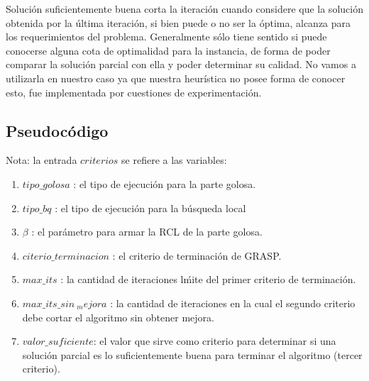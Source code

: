 Soluci\'on suficientemente buena corta la iteraci\'on cuando considere que la soluci\'on obtenida por la \'ultima iteraci\'on, si bien puede o no ser la \'optima, alcanza para los requerimientos del problema. Generalmente s\'olo tiene sentido si puede conocerse alguna cota de optimalidad para la instancia, de forma de poder comparar la soluci\'on parcial con ella y poder determinar su calidad. No vamos a utilizarla en nuestro caso ya que nuestra heur\'istica no posee forma de conocer esto, fue implementada por cuestiones de experimentaci\'on.

\vspace{2mm}

\subsection{Pseudoc\'odigo}

Nota: la entrada $criterios$ se refiere a las variables:

\begin{enumerate}
\item $tipo\_golosa$ : el tipo de ejecuci\'on para la parte golosa.
\item $tipo\_bq$ : el tipo de ejecuci\'on para la b\'usqueda local
\item $\beta$ : el par\'ametro para armar la RCL de la parte golosa.
\item $citerio\_terminacion$ : el criterio de terminaci\'on de GRASP.
\item $max\_its$ : la cantidad de iteraciones l\'mite del primer criterio de terminaci\'on.
\item $max\_its\_sin\ _mejora$ : la cantidad de iteraciones en la cual el segundo criterio debe cortar el algoritmo sin obtener mejora.
\item $ valor\_suficiente $: el valor que sirve como criterio para determinar si una soluci\'on parcial es lo suficientemente buena para terminar el algoritmo (tercer criterio).
\end{enumerate}

